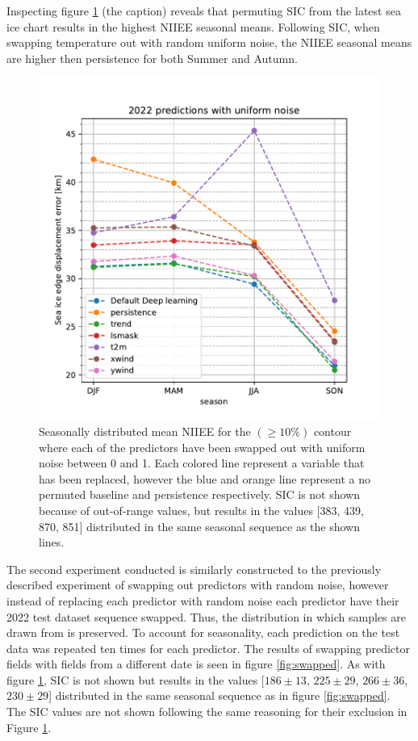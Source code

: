 \documentclass[../main/thesis.tex]{subfiles}
\begin{document}
Inspecting figure \ref{fig:noisy} (the caption) reveals that permuting SIC from the latest sea ice chart results in the highest NIIEE seasonal means. Following SIC, when swapping temperature out with random uniform noise, the NIIEE seasonal means are higher then persistence for both Summer and Autumn. 

\begin{figure}
    \centering
    \includegraphics[width=\textwidth]{noisy.pdf}
    \caption{\label{fig:noisy}Seasonally distributed mean NIIEE for the $(\geq10\%)$ contour where each of the predictors have been swapped out with uniform noise between 0 and 1. Each colored line represent a variable that has been replaced, however the blue and orange line represent a no permuted baseline and persistence respectively. SIC is not shown because of out-of-range values, but results in the values [383, 439, 870, 851] distributed in the same seasonal sequence as the shown lines.}
\end{figure}

The second experiment conducted is similarly constructed to the previously described experiment of swapping out predictors with random noise, however instead of replacing each predictor with random noise each predictor have their 2022 test dataset sequence swapped. Thus, the distribution in which samples are drawn from is preserved. To account for seasonality, each prediction on the test data was repeated ten times for each predictor. The results of swapping predictor fields with fields from a different date is seen in figure \ref{fig:swapped}. As with figure \ref{fig:noisy}, SIC is not shown but results in the values [$186 \pm 13$, $225 \pm 29$, $266 \pm 36$, $230 \pm 29$] distributed in the same seasonal sequence as in figure \ref{fig:swapped}. The SIC values are not shown following the same reasoning for their exclusion in Figure \ref{fig:noisy}.
\end{document}
